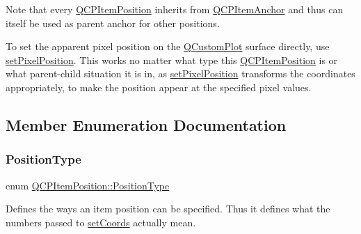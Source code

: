Note that every \mbox{\hyperlink{class_q_c_p_item_position}{Q\+C\+P\+Item\+Position}} inherits from \mbox{\hyperlink{class_q_c_p_item_anchor}{Q\+C\+P\+Item\+Anchor}} and thus can itself be used as parent anchor for other positions.

To set the apparent pixel position on the \mbox{\hyperlink{class_q_custom_plot}{Q\+Custom\+Plot}} surface directly, use \mbox{\hyperlink{class_q_c_p_item_position_a8d4f858f2089973967cf9cb81970ef0a}{set\+Pixel\+Position}}. This works no matter what type this \mbox{\hyperlink{class_q_c_p_item_position}{Q\+C\+P\+Item\+Position}} is or what parent-\/child situation it is in, as \mbox{\hyperlink{class_q_c_p_item_position_a8d4f858f2089973967cf9cb81970ef0a}{set\+Pixel\+Position}} transforms the coordinates appropriately, to make the position appear at the specified pixel values. 

\subsection{Member Enumeration Documentation}
\mbox{\label{class_q_c_p_item_position_aad9936c22bf43e3d358552f6e86dbdc8}} 
\subsubsection{\texorpdfstring{Position\+Type}{PositionType}}
{\footnotesize\ttfamily enum \mbox{\hyperlink{class_q_c_p_item_position_aad9936c22bf43e3d358552f6e86dbdc8}{Q\+C\+P\+Item\+Position\+::\+Position\+Type}}}

Defines the ways an item position can be specified. Thus it defines what the numbers passed to \mbox{\hyperlink{class_q_c_p_item_position_aa988ba4e87ab684c9021017dcaba945f}{set\+Coords}} actually mean.

